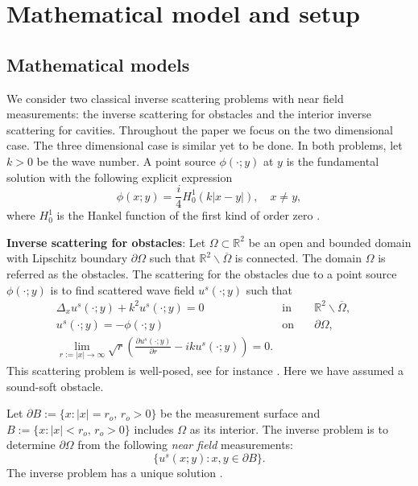 \documentclass[final]{siamltex}
\begin{document}
\section{Mathematical model and setup} \label{section model}
\subsection{Mathematical models}
We consider two classical inverse scattering problems with near field measurements:  the inverse scattering for obstacles and the interior inverse scattering for cavities. Throughout the paper we focus on the two dimensional case. The three dimensional case is similar yet to be done.  In both problems, let $k>0$ be the  wave number. A point source $\phi(\cdot;y)$ at $y$ is the fundamental solution with the following explicit expression
\begin{equation} \label{def fundamental solution}
\phi(x;y)=\frac{i}{4} H^1_0(k|x-y|),\quad x\not=y,
\end{equation}
where $H^1_0$ is the Hankel function of the first kind of order zero \cite{CK}.


\vspace{.5\baselineskip}



\noindent \textbf{Inverse scattering for obstacles}: Let $\Omega \subset \mathbb{R}^2$ be an open and bounded domain with Lipschitz boundary $\partial \Omega$ such that $\mathbb{R}^2 \backslash \overline{\Omega}$  is connected. The domain $\Omega$ is referred as the obstacles. The scattering for the obstacles due to a point source $\phi(\cdot;y)$ is to find scattered wave field $u^s(\cdot;y)$ such that
\begin{eqnarray}
\Delta_x u^s(\cdot;y) + k^2 u^s(\cdot;y) = 0 \quad &\mbox{in}& \quad \mathbb{R}^2\backslash \overline{\Omega}, \quad  \label{obstacle us eqn1}\\
u^s(\cdot;y) = -\phi(\cdot;y) \quad &\mbox{on}& \quad \partial \Omega,   \label{obstacle us eqn2} \\
\lim_{r:=|x|\to \infty} \sqrt{r}  \left( \frac{\partial u^s(\cdot;y)}{\partial r} -ik u^s(\cdot;y)\right) =0.
\end{eqnarray}
This scattering problem is well-posed, see for instance \cite{CK}.
Here we have assumed a sound-soft obstacle. 

Let $\partial B:=\{x: |x|=r_o, \,r_o>0\}$ be the measurement surface and $B:=\{x: |x|<r_o, \,r_o>0\}$ includes $\Omega$ as its interior. The inverse problem is to determine $\partial \Omega$ from the following \textit{near field} measurements:
\begin{equation} \label{obstacle nfm}
\{ u^s(x;y): x, y\in \partial B\}.
\end{equation}
The inverse problem has a unique solution \cite{CK}.
\end{document}
